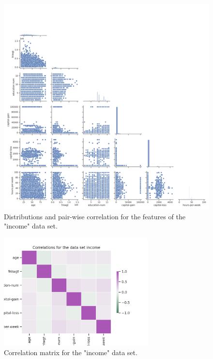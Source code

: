\documentclass{article}
\begin{document}
\begin{figure}[h!]
	\centering
	\includegraphics[width=\textwidth]{../plots/income_pairplot.png}
	\caption{ Distributions and pair-wise correlation for the features of the "income" data set.}
	\label{pairplot_income}
\end{figure}


\begin{figure}[h!]
	\centering
	\includegraphics[width=0.7\textwidth]{../plots/income_correlations.png}
	\caption{Correlation matrix for the "income" data set. }
	\label{correlation_income}
\end{figure}
\end{document}

